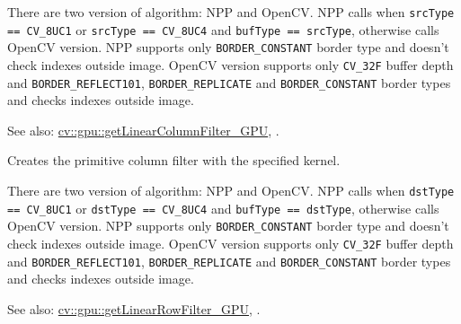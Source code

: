 There are two version of algorithm: NPP and OpenCV. NPP calls when \texttt{srcType == CV\_8UC1} or \texttt{srcType == CV\_8UC4} and \texttt{bufType == srcType}, otherwise calls OpenCV version. NPP supports only \texttt{BORDER\_CONSTANT} border type and doesn't check indexes outside image. OpenCV version supports only \texttt{CV\_32F} buffer depth and \texttt{BORDER\_REFLECT101}, \texttt{BORDER\_REPLICATE} and \texttt{BORDER\_CONSTANT} border types and checks indexes outside image.

See also: \hyperref[cppfunc.gpu.getLinearColumnFilter]{cv::gpu::getLinearColumnFilter\_GPU}, .


\label{cppfunc.gpu.getLinearColumnFilter}
Creates the primitive column filter with the specified kernel.


\begin{description}
\end{description}

There are two version of algorithm: NPP and OpenCV. NPP calls when \texttt{dstType == CV\_8UC1} or \texttt{dstType == CV\_8UC4} and \texttt{bufType == dstType}, otherwise calls OpenCV version. NPP supports only \texttt{BORDER\_CONSTANT} border type and doesn't check indexes outside image. OpenCV version supports only \texttt{CV\_32F} buffer depth and \texttt{BORDER\_REFLECT101}, \texttt{BORDER\_REPLICATE} and \texttt{BORDER\_CONSTANT} border types and checks indexes outside image.\newline

See also: \hyperref[cppfunc.gpu.getLinearRowFilter]{cv::gpu::getLinearRowFilter\_GPU}, .


